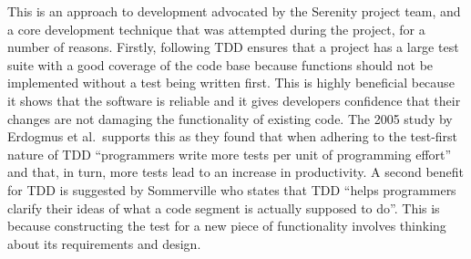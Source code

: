 This is an approach to development advocated by the Serenity project team, and a core
development technique that was attempted during the project,
for a number of reasons. Firstly, following TDD ensures that a project has a large
test suite with a good coverage of the code base because functions should not be
implemented without a test being written first. This is highly beneficial because
it shows that the software is reliable and it gives developers confidence that their
changes are not damaging the functionality of existing code. The 2005 study by
Erdogmus et al.\ supports this as they found that when adhering to the test-first
nature of TDD ``programmers write more tests per unit of programming effort'' and
that, in turn, more tests lead to an increase in productivity.\cite{erdogmus2005}
A second benefit for TDD is suggested by Sommerville who states that TDD ``helps
programmers clarify their ideas of what a code segment is actually supposed to
do''. This is because constructing the test for
a new piece of functionality involves thinking about its requirements and design.



